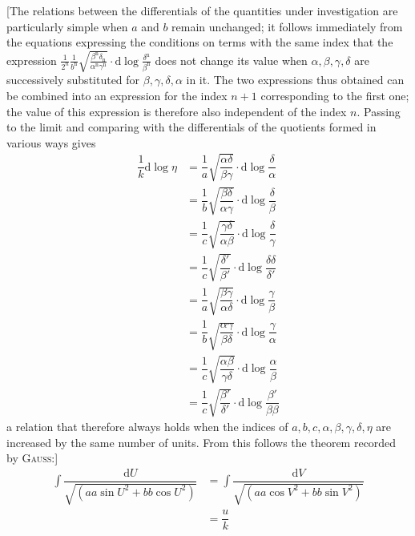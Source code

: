 \begingroup
\renewcommand{\arraystretch}{1.45}

[The relations between the differentials of the quantities under investigation are particularly simple when $a$ and $b$ remain unchanged; it follows immediately from the equations expressing the conditions on terms with the same index that the expression
$\frac{1}{2^n}\frac{1}{b^{\mathrm n}}\surd{\frac{\beta^{\mathrm n}\delta_{\mathrm n}}{\alpha^{\mathrm n}\gamma^{\mathrm n}}}\cdot\mathrm{d}\log\frac{\delta^{\mathrm n}}{\beta^{\mathrm n}}$
does not change its value when $\alpha,\allowbreak \beta,\allowbreak \gamma,\allowbreak \delta$ are successively substituted for $\beta,\allowbreak \gamma,\allowbreak \delta,\allowbreak \alpha$ in it. The two expressions thus obtained can be combined into an expression for the index $n+1$ corresponding to the first one; the value of this expression is therefore also independent of the index $n$. Passing to the limit and comparing with the differentials of the quotients formed in various ways gives
\[
\begin{aligned}\dfrac{1}{k}\mathrm{d}\log\eta
&=\dfrac{1}{a}\surd{\dfrac{\alpha\delta}{\beta\gamma}}\cdot\mathrm{d}\log\dfrac{\delta}{\alpha}
\\[7pt]&=\dfrac{1}{b}\surd{\dfrac{\beta\delta}{\alpha\gamma}}\cdot\mathrm{d}\log\dfrac{\delta}{\beta}
\\[7pt]&=\dfrac{1}{c}\surd{\dfrac{\gamma\delta}{\alpha\beta}}\cdot\mathrm{d}\log\dfrac{\delta}{\gamma}
\\[7pt]&=\dfrac{1}{c}\surd{\dfrac{\delta'}{\beta'}}\cdot\mathrm{d}\log\dfrac{\delta\delta}{\delta'}
\\[7pt]&=\dfrac{1}{a}\surd{\dfrac{\beta\gamma}{\alpha\delta}}\cdot\mathrm{d}\log\dfrac{\gamma}{\beta}
\\[7pt]&=\dfrac{1}{b}\surd{\dfrac{\alpha\gamma}{\beta\delta}}\cdot\mathrm{d}\log\dfrac{\gamma}{\alpha}
\\[7pt]&=\dfrac{1}{c}\surd{\dfrac{\alpha\beta}{\gamma\delta}}\cdot\mathrm{d}\log\dfrac{\alpha}{\beta}
\\[7pt]&=\dfrac{1}{c}\surd{\dfrac{\beta'}{\delta'}}\cdot\mathrm{d}\log\dfrac{\beta'}{\beta\beta}\end{aligned}
\]
a relation that therefore always holds when the indices of $a,\allowbreak b,\allowbreak c,\allowbreak \alpha,\allowbreak \beta,\allowbreak \gamma,\allowbreak \delta,\allowbreak \eta$ are increased by the same number of units. From this follows the theorem recorded by \textsc{Gauss}:]
\[
\begin{aligned}\int\dfrac{\mathrm{d}U}{\surd{(aa\sin U^2+bb\cos U^2)}}
&=\int\dfrac{\mathrm{d}V}{\surd{(aa\cos V^2+bb\sin V^2)}}\\[6pt]&=\dfrac{u}{k}\end{aligned}
\]

